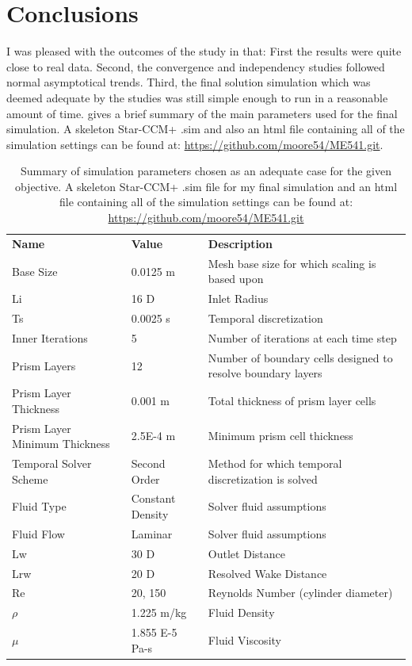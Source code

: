\documentclass[10pt,english]{article}
\begin{document}
\newpage
\section{Conclusions}

I was pleased with the outcomes of the study in that: First the results were quite close to real data.  Second, the convergence and independency studies followed normal asymptotical trends.  Third, the final solution simulation which was deemed adequate by the studies was still simple enough to run in a reasonable amount of time.   gives a brief summary of the main parameters used for the final simulation. A skeleton Star-CCM+ .sim and also an html file containing all of the simulation settings can be found at: \href{https://github.com/moore54/ME541.git}{https://github.com/moore54/ME541.git}.

\begin{table}[h]
\vspace{20pt}
\centering
  \begin{tabular}{lll}
    \textbf{Name} & \textbf{Value} & \textbf{Description}  \\
    Base Size & 0.0125 m & Mesh base size for which scaling is based upon  \\
    Li & 16 D & Inlet Radius\\
    Ts & 0.0025 s & Temporal discretization\\
    Inner Iterations & 5 & Number of iterations at each time step\\
    Prism Layers & 12 & Number of boundary cells designed to resolve boundary layers\\
    Prism Layer Thickness & 0.001 m & Total thickness of prism layer cells\\
    Prism Layer Minimum Thickness & 2.5E-4 m & Minimum prism cell thickness\\ 
    Temporal Solver Scheme & Second Order & Method for which temporal discretization is solved\\
    Fluid Type & Constant Density & Solver fluid assumptions\\
    Fluid Flow & Laminar & Solver fluid assumptions\\
    Lw & 30 D & Outlet Distance\\
    Lrw & 20 D & Resolved Wake Distance\\
    Re & 20, 150 & Reynolds Number (cylinder diameter)\\
    $\rho$  & 1.225 m/kg & Fluid Density\\
    $\mu$  & 1.855 E-5 Pa-s & Fluid Viscosity\\ 
  \end{tabular}
  \caption{Summary of simulation parameters chosen as an adequate case for the given objective. A skeleton Star-CCM+ .sim file for my final simulation and an html file containing all of the simulation settings can be found at: \href{https://github.com/moore54/ME541.git}{https://github.com/moore54/ME541.git}}
  \label{tab:chosen_sim}
\end{table}
\end{document}

